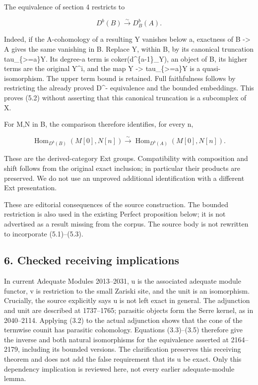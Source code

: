 The equivalence of section 4 restricts to

\[
 D^b(B)\xrightarrow{\sim}D^b_B(A).                      \tag{5.2}
\]

Indeed,\allowbreak{} if the A-cohomology of a resulting Y vanishes below a,\allowbreak{} exactness of B \allowbreak{}-> A gives the same vanishing in B. Replace Y,\allowbreak{} within B,\allowbreak{} by its canonical truncation tau\_\allowbreak{}\{>\allowbreak{}=a\}Y. Its degree-a term is coker(d\textasciicircum{}\{a-1\}\_\allowbreak{}Y)\allowbreak{},\allowbreak{} an object of B,\allowbreak{} its higher terms are the original Y\textasciicircum{}i,\allowbreak{} and the map Y \allowbreak{}-> tau\_\allowbreak{}\{>\allowbreak{}=a\}Y is a quasi-isomorphism. The upper term bound is retained. Full faithfulness follows by restricting the already proved D\^{}- equivalence and the bounded embeddings. This proves (5.2)\allowbreak{} without asserting that this canonical truncation is a subcomplex of X.

For M,\allowbreak{}N in B,\allowbreak{} the comparison therefore identifies,\allowbreak{} for every n,\allowbreak{}

\[
 \operatorname{Hom}_{D^b(B)}(M[0],N[n])
   \xrightarrow{\sim}
 \operatorname{Hom}_{D^b(A)}(M[0],N[n]).                 \tag{5.3}
\]

These are the derived-category Ext groups. Compatibility with composition and shift follows from the original exact inclusion; in particular their products are preserved. We do not use an unproved additional identification with a different Ext presentation.

These are editorial consequences of the source construction. The bounded restriction is also used in the existing Perfect proposition below; it is not advertised as a result missing from the corpus. The source body is not rewritten to incorporate (5.1)\allowbreak{}–\allowbreak{}(5.3)\allowbreak{}.

\subsection{6. Checked receiving implications}\label{proofs-5910-6199-checked-receiving-implications}

In current Adequate Modules 2013–\allowbreak{}2031,\allowbreak{} u is the associated adequate module functor,\allowbreak{} v is restriction to the small Zariski site,\allowbreak{} and the unit is an isomorphism. Crucially,\allowbreak{} the source explicitly says u is not left exact in general. The adjunction and unit are described at 1737–\allowbreak{}1765; parasitic objects form the Serre kernel,\allowbreak{} as in 2040–\allowbreak{}2114. Applying (3.2)\allowbreak{} to the actual adjunction shows that the cone of the termwise counit has parasitic cohomology. Equations (3.3)\allowbreak{}–\allowbreak{}(3.5)\allowbreak{} therefore give the inverse and both natural isomorphisms for the equivalence asserted at 2164–\allowbreak{}2179,\allowbreak{} including its bounded versions. The clarification preserves this receiving theorem and does not add the false requirement that its u be exact. Only this dependency implication is reviewed here,\allowbreak{} not every earlier adequate-module lemma.

